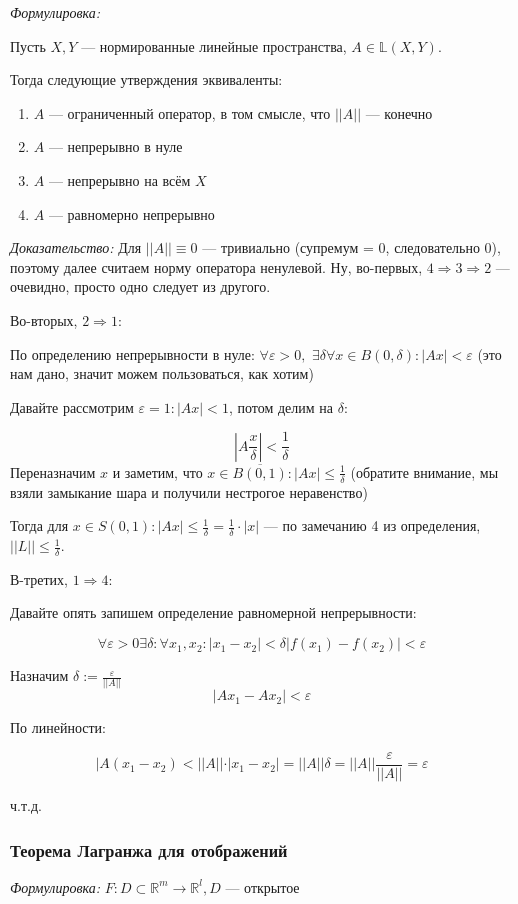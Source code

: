 \documentclass{article}
\def\dbl{\,\,}
\begin{document}
\textit{Формулировка:}

Пусть $X, Y$ --- нормированные линейные пространства, $A \in \mathbb{L}(X, Y)$.

Тогда следующие утверждения эквиваленты:

\begin{enumerate}
\item $A$ --- ограниченный оператор, в том смысле, что $||A||$ --- конечно
\item $A$ --- непрерывно в нуле
\item $A$ --- непрерывно на всём $X$
\item $A$ --- равномерно непрерывно
\end{enumerate}


\textit{Доказательство:}
Для $||A|| \equiv 0$ --- тривиально (супремум = 0, следовательно 0), поэтому далее считаем норму оператора ненулевой.
Ну, во-первых, $4 \Rightarrow 3 \Rightarrow 2$ --- очевидно, просто одно следует из другого.

Во-вторых,  $2 \Rightarrow 1$:

По определению непрерывности в нуле: $\forall \varepsilon > 0, \dbl \exists \delta  \forall x \in B(0, \delta): |Ax| < \varepsilon$ (это нам дано, значит можем пользоваться, как хотим)

Давайте рассмотрим $\varepsilon = 1: |Ax| < 1$, потом делим на $\delta$:

\[|A\frac{x}{\delta}| < \frac{1}{\delta}\]
Переназначим $x$ и заметим, что $x \in \overline{B(0, 1)}: |Ax| \le \frac{1}{\delta}$ (обратите внимание, мы взяли замыкание шара и получили нестрогое неравенство)

Тогда для $x \in S(0, 1): |Ax| \le \frac{1}{\delta} = \frac{1}{\delta} \cdot |x|$ --- по замечанию 4 из определения, $||L|| \le \frac{1}{\delta}$.

В-третих, $1 \Rightarrow 4$:

Давайте опять запишем определение равномерной непрерывности:

\[\forall \varepsilon > 0 \exists \delta: \forall x_1, x_2: |x_1 - x_2| < \delta |f(x_1) - f(x_2)| < \varepsilon\]

Назначим $\delta := \frac{\varepsilon}{||A||}$
\[|Ax_1 - Ax_2| < \varepsilon\]

По линейности:

\[|A(x_1 - x_2) < ||A|| \cdot |x_1 - x_2| = ||A|| \delta = ||A|| \frac{\varepsilon}{||A||} = \varepsilon\]

ч.т.д.

\subsubsection{Теорема Лагранжа для отображений}
\textit{Формулировка:}
$F: D \subset \mathbb{R}^m \rightarrow \mathbb{R}^l, D$ --- открытое
\end{document}
